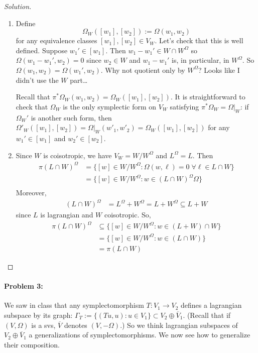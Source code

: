 \begin{proof}[Solution]\leavevmode 
	\begin{enumerate}[label=\alph*.]
		\item Define
			\[\Omega_{W}([w_1],[w_2]):=\Omega(w_1,w_2)\]
			for any equivalence classes $[w_1],[w_2]\in V_{W}$. Let's check that this is well defined. Suppose $w_1'\in [w_1]$. Then $w_1-w_1'\in W\cap W^{\Omega}$ so $\Omega(w_1-w_1',w_2)=0$ since $w_2\in W$ and $w_1-w_1'$ is, in particular, in $W^{\Omega}$. So $\Omega(w_1,w_2)=\Omega(w_1',w_2)$. {\color{magenta}Why not quotient only by $W^{\Omega}$? Looks like I didn't use the $W$ part…}

			Recall that $\pi^{*} \Omega_{W}(w_1,w_2)=\Omega_{W}([w_1],[w_2])$. It is straightforward to check that $\Omega_{W}$ is the only symplectic form on $V_{W}$ satisfying $\pi^{*} \Omega_{W}=\Omega|_{W}$: if $\Omega_{W}'$ is another such form, then $\Omega'_{W}([w_1],[w_2])=\Omega|_{W}(w'_1,w'_2)=\Omega_{W}([w_1],[w_2])$ for any $w_1'\in [w_1]$ and $w_2'\in [w_2]$.

			\item Since $W$ is coisotropic, we have $V_W=W/W^\Omega$ and $L^\Omega=L$. Then
				\begin{align*}
					\pi(L\cap W)^\Omega & =\{[w]\in W/W^\Omega:\Omega(w,\ell)=0\;\forall \ell\in L\cap W\} \\
						      &=\{[w]\in W/W^\Omega:w\in (L\cap W)^\Omega\Omega\} \\
				\end{align*}
				Moreover,
				\begin{align*}
					(L\cap W)^\Omega & =L^\Omega+ W^\Omega =L+ W^\Omega\subseteq L + W
				\end{align*}
				since $L$ is lagrangian and $W$ coisotropic. So,
				\begin{align*}
					\pi(L\cap W)^\Omega &\subseteq\{[w]\in W/W^\Omega:w\in (L+W)\cap W\}\\&=\{[w]\in W/W^\Omega:w\in(L\cap W)\}\\&= \pi(L\cap W)
				\end{align*}
\end{enumerate}
\end{proof}

\paragraph{Problem 3:}  We saw in class that any symplectomorphism $T:V_1\to V_2$ defines a lagrangian subspace by its graph: $\Gamma_{T}:=\{(Tu,u):u\in V_1 \}\subset V_2\oplus \overline{V}_{1}$. (Recall that if $(V,\Omega)$ is a svs,  $\overline{V}$ denotes $(V,-\Omega)$.) So we think lagrangian subspaces of $V_2\oplus \overline{V}_{1}$ a generalizations of symplectomorphisms. We now see how to generalize their composition. 


